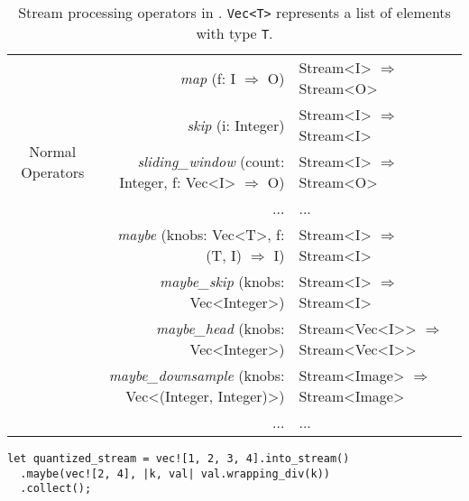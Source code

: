 \begin{table*}
  \small
  \centering
  \begin{tabular}{ c r l }
    \toprule
    \multirow{5}{*}{Normal Operators}
    & \textit{map} (f: I $\Rightarrow$ O) & Stream<I> $\Rightarrow$ Stream<O> \\
    & \textit{skip} (i: Integer) & Stream<I> $\Rightarrow$
                                   Stream<I> \\
    & \textit{sliding\_window} (count: Integer, f: Vec<I> $\Rightarrow$ O) & Stream<I> $\Rightarrow$
                                                                            Stream<O> \\
    & ... & ... \\
    \midrule
    \multirow{5}{*}{Degradation Operators}
    & \textit{maybe} (knobs: Vec<T>, f:  (T, I) $\Rightarrow$ I) & Stream<I> $\Rightarrow$
                                                                 Stream<I> \\
    & \textit{maybe\_skip} (knobs: Vec<Integer>) & Stream<I> $\Rightarrow$ Stream<I> \\
    & \textit{maybe\_head} (knobs: Vec<Integer>) & Stream<Vec<I>{}> $\Rightarrow$
                                                   Stream<Vec<I>{}> \\
    & \textit{maybe\_downsample} (knobs: Vec<(Integer, Integer)>) & Stream<Image> $\Rightarrow$ Stream<Image> \\
    & ... & ... \\
    \bottomrule
  \end{tabular}
  \caption{Stream processing operators in \sysname{}. \texttt{Vec<T>} represents
    a list of elements with type \texttt{T}.}
  \label{tab:operators}
  \vspace{-1em}
\end{table*}

\vspace{-2pt}
\begin{lstlisting}
let quantized_stream = vec![1, 2, 3, 4].into_stream()
  .maybe(vec![2, 4], |k, val| val.wrapping_div(k))
  .collect();
\end{lstlisting}

